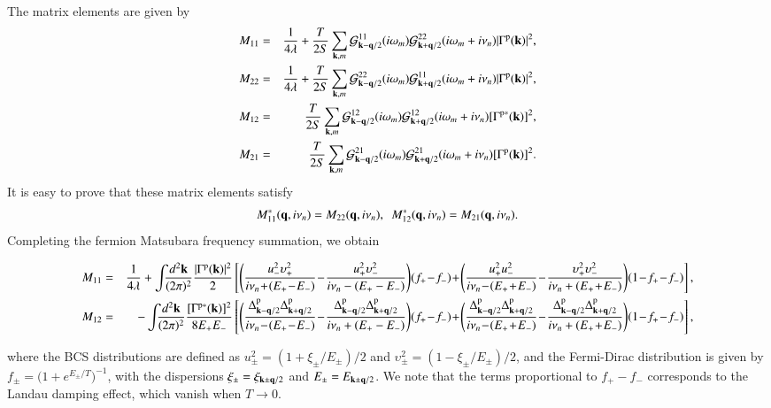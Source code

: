 \documentclass[aps,prd,amsmath,two column,nofootinbib,amssymb,referee]{revtex4}
\begin{document}
The matrix elements are given by
\begin{eqnarray}
M_{11}&=&{1\over4\lambda}+{T\over2S}\sum_{{\bf k},m}{\cal G}_{{\bf k}-{\bf q}/2}^{11}(i\omega_m){\cal G}_{{\bf k}+{\bf q}/2}^{22}(i\omega_m+i\nu_n)|\Gamma^{\rm p}({\bf k})|^2,\nonumber\\
M_{22}&=&{1\over4\lambda}+{T\over2S}\sum_{{\bf k},m}{\cal G}_{{\bf k}-{\bf q}/2}^{22}(i\omega_m){\cal G}_{{\bf k}+{\bf q}/2}^{11}(i\omega_m+i\nu_n)|\Gamma^{\rm p}({\bf k})|^2,\nonumber\\
M_{12}&=&{T\over2S}\sum_{{\bf k},m}{\cal G}_{{\bf k}-{\bf q}/2}^{12}(i\omega_m){\cal G}_{{\bf k}+{\bf q}/2}^{12}(i\omega_m+i\nu_n)[\Gamma^{{\rm p}*}({\bf k})]^2,\nonumber\\
M_{21}&=&{T\over2S}\sum_{{\bf k},m}{\cal G}_{{\bf k}-{\bf q}/2}^{21}(i\omega_m){\cal G}_{{\bf k}+{\bf q}/2}^{21}(i\omega_m+i\nu_n)[\Gamma^{{\rm p}}({\bf k})]^2.
\end{eqnarray}
It is easy to prove that these matrix elements satisfy 
\begin{eqnarray}
M_{11}^*({\bf q},i\nu_n)=M_{22}({\bf q},i\nu_n),\ \ M_{12}^*({\bf q},i\nu_n)=M_{21}({\bf q},i\nu_n).
\end{eqnarray}
Completing the fermion Matsubara frequency summation, we obtain 
\begin{widetext}
\begin{eqnarray}\label{matrixp}
M_{11}&=&{1\over4\lambda}+\int\!\!\! {d^2{\bf k}\over(2\pi)^2}{|\Gamma^{\rm p}({\bf k})|^2\over2}\left[\Bigg({u_-^2\upsilon_+^2\over i\nu_n\!+\!(E_+\!-\!E_-)}\!-\!{u_+^2\upsilon_-^2\over i\nu_n-(E_+-E_-)}\Bigg)(f_+\!-\!f_-)\!+\!\Bigg({u_+^2u_-^2\over i\nu_n\!-\!(E_+\!+\!E_-)}\!-\!{\upsilon_+^2\upsilon_-^2\over i\nu_n+(E_+\!+\!E_-)}\Bigg)(1\!-\!f_+\!-\!f_-)\right],\nonumber\\
M_{12}&=&-\int\!\!\! {d^2{\bf k}\over(2\pi)^2}{[\Gamma^{{\rm p}*}({\bf k})]^2\over8E_+E_-}\left[\Bigg({\Delta_{{\bf k}-{\bf q}/2}^{\rm p}\Delta_{{\bf k}+{\bf q}/2}^{\rm p}\over i\nu_n\!-\!(E_+\!-\!E_-)}\!-\!{\Delta_{{\bf k}-{\bf q}/2}^{\rm p}\Delta_{{\bf k}+{\bf q}/2}^{\rm p}\over i\nu_n+(E_+-E_-)}\Bigg)(f_+\!-\!f_-)\!+\!\Bigg({\Delta_{{\bf k}-{\bf q}/2}^{\rm p}\Delta_{{\bf k}+{\bf q}/2}^{\rm p}\over i\nu_n\!-\!(E_+\!+\!E_-)}\!-\!{\Delta_{{\bf k}-{\bf q}/2}^{\rm p}\Delta_{{\bf k}+{\bf q}/2}^{\rm p}\over i\nu_n+(E_+\!+\!E_-)}\Bigg)(1\!-\!f_+\!-\!f_-)\right],
\end{eqnarray}
\end{widetext}
where the BCS distributions are defined as $u_\pm^2=(1+\xi_\pm/E_\pm)/2$ and $\upsilon_\pm^2=(1-\xi_\pm/E_\pm)/2$, and the Fermi-Dirac distribution is given by $f_\pm=\Big(1+e^{E_\pm/T}\Big)^{-1}$, 
with the dispersions $\xi_\pm=\xi_{{\bf k}\pm{\bf q}/2}$ and $E_\pm=E_{{\bf k}\pm{\bf q}/2}$.  We note that the terms proportional to $f_+-f_-$ corresponds to the Landau damping effect, which vanish when $T\rightarrow0$.
\end{document}
